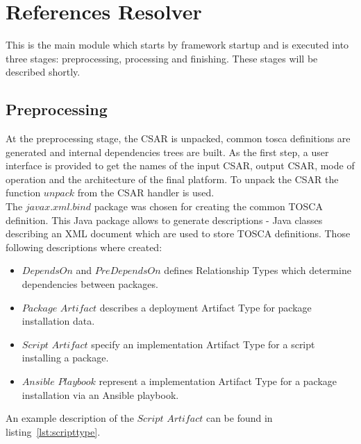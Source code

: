 \section{References Resolver}
This is the main module which starts by framework startup and is executed into three stages: preprocessing, processing and finishing. 
These stages will be described shortly.

\subsection*{Preprocessing}
At the preprocessing stage, the CSAR is unpacked, common \gls{tosca} definitions are generated and internal dependencies trees are built. 
%
As the first step, a user interface is provided to get the names of the input CSAR, output CSAR, mode of operation and the architecture of the final platform.
To unpack the CSAR the function $unpack$ from the CSAR handler is used.\\
%
The $javax$.$xml$.$bind$ package was chosen for creating the common TOSCA definition. 
This Java package allows to generate descriptions - Java classes describing an XML document which are used to store TOSCA definitions. 
Those following descriptions where created:
\begin{itemize}
	\item $DependsOn$ and $PreDependsOn$ defines Relationship Types which determine dependencies %
	  between packages.%
	\item $Package$ $Artifact$ describes a deployment Artifact Type for package installation data.
	\item $Script$ $Artifact$ specify an implementation Artifact Type for a script installing a package.
	\item $Ansible$ $Playbook$ represent a implementation Artifact Type for a package installation via an Ansible playbook.
\end{itemize}
An example description of the $Script$ $Artifact$ can be found in listing~\ref{lst:scripttype}.
